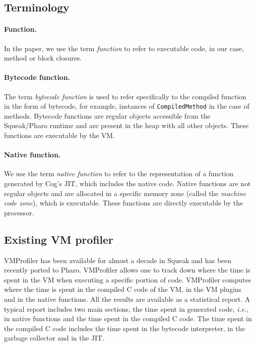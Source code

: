 \documentclass[10pt,nonatbib]{sigplanconf}
\newcommand{\ct}{\lstinline[backgroundcolor=\color{white},basicstyle=\small\ttfamily]}
\newcommand{\ie}{\emph{i.e.,}\xspace}
\begin{document}
\subsection{Terminology}

\paragraph{Function.} In the paper, we use the term \emph{function} to refer to executable code, in our case, method or block closures.

\paragraph{Bytecode function.} The term \emph{bytecode function} is used to refer specifically to the compiled function in the form of bytecode, for example, instances of \ct{CompiledMethod} in the case of methods. Bytecode functions are regular objects accessible from the Squeak/Pharo runtime and are present in the heap with all other objects. These functions are executable by the VM.

\paragraph{Native function.} We use the term \emph{native function} to refer to the representation of a function generated by Cog's JIT, which includes the native code. Native functions are not regular objects and are allocated in a specific memory zone (called the \emph{machine code zone}), which is executable. These functions are directly executable by the processor.

\subsection{Existing VM profiler}

VMProfiler has been available for almost a decade in Squeak and has been recently ported to Pharo. VMProfiler allows one to track down where the time is spent in the VM when executing a specific portion of code. VMProfiler computes where the time is spent in the compiled C code of the VM, in the VM plugins and in the native functions. All the results are available as a statistical report. A typical report includes two main sections, the time spent in generated code, \ie in native functions and the time spent in the compiled C code. The time spent in the compiled C code includes the time spent in the bytecode interpreter, in the garbage collector and in the JIT. 
 
\end{document}
